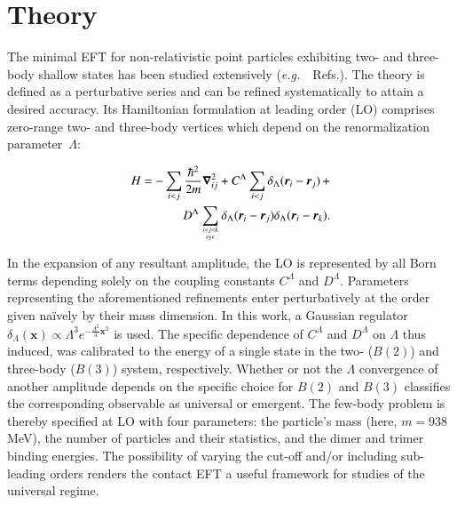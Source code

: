 \documentclass[preprint,12pt]{elsarticle}
\newcommand{\lec}{C^\Lambda}
\newcommand{\led}{D^\Lambda}
\newcommand{\eg}{\textit{e.g.}~}
\newcommand{\ve}[1]{\ensuremath{\boldsymbol{#1}}}
\begin{document}
\section*{Theory}
The minimal EFT for non-relativistic point particles exhibiting two- and three-body shallow states has been studied extensively (\eg~Refs.\cite{Lepage:1997cs,vanKolck:1999mw, Bedaque:1998kg, Braaten:2004rn, Hammer:2017tjm, Hammer:2019poc}).
The theory is defined as a perturbative series and can be refined systematically to attain a desired accuracy.
Its Hamiltonian formulation at leading order (LO) comprises zero-range two- and three-body vertices which depend on the renormalization parameter~$\Lambda$:

\begin{align}
H = - \sum_{i<j} \frac{\hbar^2}{2m}\ve{\nabla}_{ij}^2+ \lec \sum_{i<j}{\delta_\Lambda(\ve{r}_i-\ve{r}_j)} 
\,+\nonumber\\
\led \sum_{ i<j<k \atop \text{cyc} }\delta_\Lambda(\ve{r}_i-\ve{r}_j)\delta_\Lambda(\ve{r}_i-\ve{r}_k).
\label{eq:hamiltonian}
\end{align}

In the expansion of any resultant amplitude, the LO is represented by all Born
terms depending solely on the coupling constants $\lec$ and $\led$. 
Parameters representing the aforementioned refinements
enter perturbatively at the order given na\"ively by their mass
dimension. 
In this work, a Gaussian regulator 
\mbox{$\delta_\Lambda(\ve{x}) \propto\Lambda^3 e^{-\frac{\Lambda^2}{4}\ve{x}^2}$} is used.
The specific dependence of $\lec$ and $\led$ on $\Lambda$ thus induced, was calibrated to
the energy of a single state in the two- ($B(2)$) and three-body
($B(3)$) system, respectively.
Whether or not the $\Lambda$ convergence of another amplitude depends on the
specific choice for $B(2)$ and $B(3)$ classifies the corresponding observable as
universal or emergent.
The few-body problem is thereby specified at LO with four parameters: the particle's mass
(here, $m=938~$MeV), the number of particles and their statistics,
and the dimer and trimer binding energies.
The possibility of varying the cut-off and/or including sub-leading orders renders the contact EFT
a useful framework for studies of the universal regime.
\end{document}
